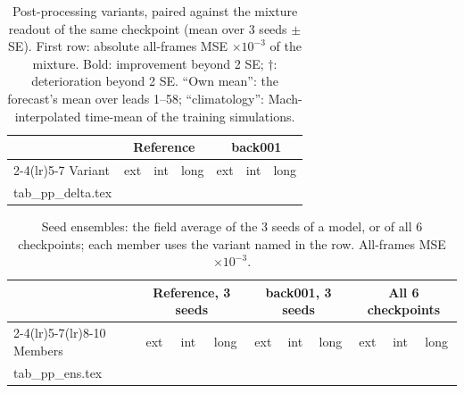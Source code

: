 \documentclass[10.5pt,a4paper]{article}
\begin{document}
\begin{table}[h]
\centering\scriptsize
\caption{Post-processing variants, paired against the mixture readout of the same checkpoint (mean
over 3 seeds $\pm$ SE). First row: absolute all-frames MSE $\times10^{-3}$ of the mixture. Bold:
improvement beyond 2 SE; $\dagger$: deterioration beyond 2 SE. ``Own mean'': the forecast's mean
over leads 1--58; ``climatology'': Mach-interpolated time-mean of the training simulations.}
\label{tab:pp}
\begin{tabular}{lcccccc}
\toprule
 & \multicolumn{3}{c}{Reference} & \multicolumn{3}{c}{back001}\\
\cmidrule(lr){2-4}\cmidrule(lr){5-7}
Variant & ext & int & long & ext & int & long\\
\midrule
{} tab_pp_delta.tex
\bottomrule
\end{tabular}
\end{table}

\begin{table}[h]
\centering\scriptsize
\caption{Seed ensembles: the field average of the 3 seeds of a model, or of all 6 checkpoints;
each member uses the variant named in the row. All-frames MSE $\times10^{-3}$.}
\label{tab:ppens}
\begin{tabular}{lccccccccc}
\toprule
 & \multicolumn{3}{c}{Reference, 3 seeds} & \multicolumn{3}{c}{back001, 3 seeds} &
   \multicolumn{3}{c}{All 6 checkpoints}\\
\cmidrule(lr){2-4}\cmidrule(lr){5-7}\cmidrule(lr){8-10}
Members & ext & int & long & ext & int & long & ext & int & long\\
\midrule
{} tab_pp_ens.tex
\bottomrule
\end{tabular}
\end{table}
\end{document}
